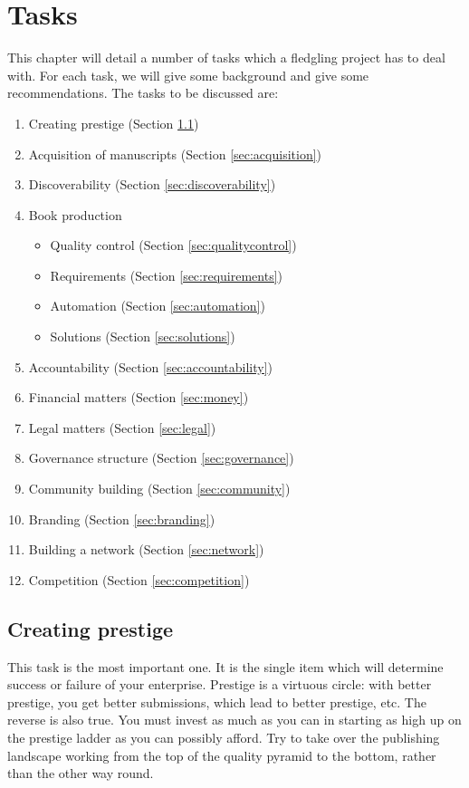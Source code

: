 \documentclass[nonflat,modfonts,output=book] {langsci/langscibook}
\begin{document}
\chapter{Tasks}
This chapter will detail a number of tasks which a fledgling project has to deal with. For each task, we will give some background and give some recommendations. The tasks to be discussed are:

\begin{enumerate}
 \item Creating prestige (Section \ref{sec:prestige})
 \item Acquisition of manuscripts (Section \ref{sec:acquisition})
 \item Discoverability (Section \ref{sec:discoverability})
 \item Book production 
 \begin{itemize}
  \item Quality control (Section \ref{sec:qualitycontrol})
  \item Requirements (Section \ref{sec:requirements})
  \item Automation (Section \ref{sec:automation})
  \item Solutions (Section \ref{sec:solutions})
 \end{itemize}
 \item Accountability (Section \ref{sec:accountability})
 \item Financial matters (Section \ref{sec:money})
 \item Legal matters (Section \ref{sec:legal})
 \item Governance structure (Section \ref{sec:governance})
 \item Community building (Section \ref{sec:community})
 \item Branding (Section \ref{sec:branding})
 \item Building a network (Section \ref{sec:network})
 \item Competition (Section \ref{sec:competition})
\end{enumerate}


\section{Creating prestige}\label{sec:prestige}
This task is the most important one. It is the single item which will determine success or failure of your enterprise. 
Prestige is a virtuous circle: with better prestige, you get better submissions, which lead to better prestige, etc. The reverse is also true. You must invest as much as you can in starting as high up on the prestige ladder as you can possibly afford. Try to take over the publishing landscape working from the top of the quality pyramid to the bottom, rather than the other way round.
\end{document}
